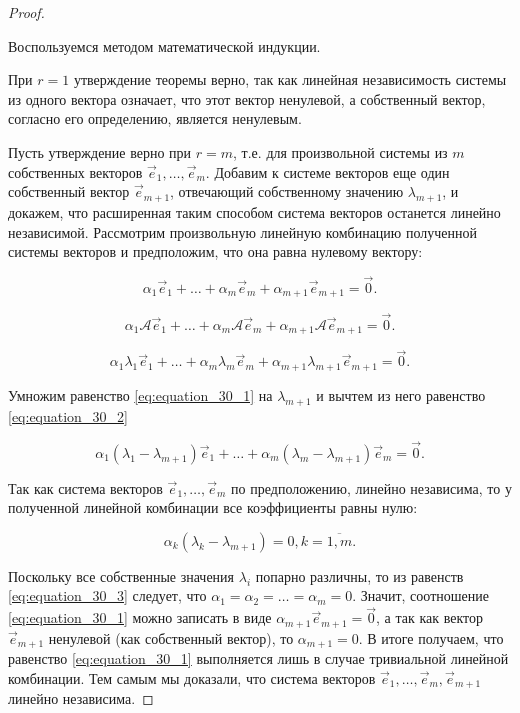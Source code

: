 \begin{proof}~

    Воспользуемся методом математической индукции.

    При $r = 1$ утверждение теоремы верно, так как линейная независимость системы из одного вектора означает, что этот вектор ненулевой, а собственный вектор, согласно его определению, является ненулевым.

    Пусть утверждение верно при $r = m$, т.е. для произвольной системы из $m$ собственных векторов $\vec{e}_1, \ldots, \vec{e}_m$. Добавим к системе векторов еще один собственный вектор $\vec{e}_{m + 1}$, отвечающий собственному значению $\lambda_{m + 1}$, и докажем, что расширенная таким способом система векторов останется линейно независимой. Рассмотрим произвольную линейную комбинацию полученной системы векторов и предположим, что она равна нулевому вектору:

    \begin{equation}
        \alpha_1\vec{e}_1 + \ldots + \alpha_m\vec{e}_m + \alpha_{m + 1}\vec{e}_{m + 1} = \vec{0}.
        \label{eq:equation_30_1}
    \end{equation}

    $$\alpha_1\mathscr{A}\vec{e}_1 + \ldots + \alpha_m\mathscr{A}\vec{e}_m + \alpha_{m + 1}\mathscr{A}\vec{e}_{m + 1} = \vec{0}.$$

    \begin{equation}
        \alpha_1\lambda_1\vec{e}_1 + \ldots + \alpha_m\lambda_m\vec{e}_m + \alpha_{m + 1}\lambda_{m + 1}\vec{e}_{m + 1} = \vec{0}.
        \label{eq:equation_30_2}
    \end{equation}

    Умножим равенство \eqref{eq:equation_30_1} на $\lambda_{m + 1}$ и вычтем из него равенство \eqref{eq:equation_30_2}

    $$\alpha_1(\lambda_1 - \lambda_{m + 1})\vec{e}_1 + \ldots + \alpha_m(\lambda_m - \lambda_{m + 1})\vec{e}_m = \vec{0}.$$

    Так как система векторов $\vec{e}_1, \ldots, \vec{e}_m$ по предположению, линейно независима, то у полученной линейной комбинации все коэффициенты равны нулю:

    \begin{equation}
        \alpha_k(\lambda_k - \lambda_{m + 1}) = 0, k = \overline{1, m}.
        \label{eq:equation_30_3}
    \end{equation}

    Поскольку все собственные значения $\lambda_i$ попарно различны, то из равенств \eqref{eq:equation_30_3} следует, что $\alpha_1 = \alpha_2 = \ldots = \alpha_m = 0$. Значит, соотношение \eqref{eq:equation_30_1} можно записать в виде $\alpha_{m + 1}\vec{e}_{m + 1} = \vec{0}$, а так как вектор $\vec{e}_{m + 1}$ ненулевой (как собственный вектор), то $\alpha_{m + 1} = 0$. В итоге получаем, что равенство \eqref{eq:equation_30_1} выполняется лишь в случае тривиальной линейной комбинации. Тем самым мы доказали, что система векторов $\vec{e}_1, \ldots, \vec{e}_m, \vec{e}_{m + 1}$ линейно независима.
\end{proof}